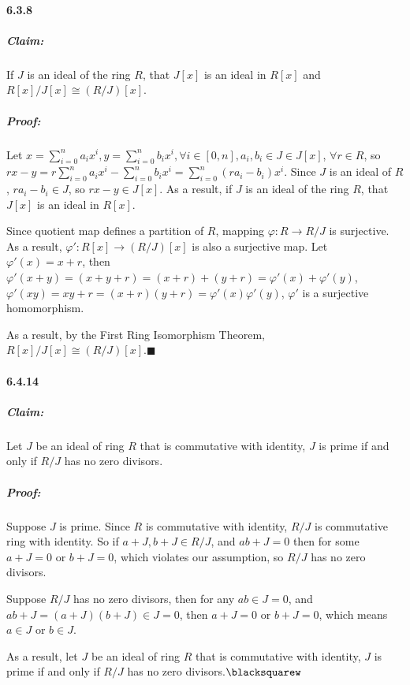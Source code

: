 \documentclass[11pt]{article}
\begin{document}
	\paragraph{6.3.8}
		\subparagraph{Claim:} If $J$ is an ideal of the ring $R$, that $J[x]$ is an ideal in $R[x]$ and $R[x]/J[x] \cong (R/J)[x]$.
		\subparagraph{Proof:} Let $x = \sum_{i = 0}^n a_ix^i , y = \sum_{i = 0}^n b_ix^i, \forall i \in [0, n], a_i, b_i\in J \in J[x]$, $\forall r \in R$, so $rx - y = r\sum_{i = 0}^n a_ix^i - \sum_{i = 0}^n b_ix^i = \sum_{i = 0}^n (ra_i - b_i)x^i$. Since $J$ is an ideal of $R$, $ra_i - b_i \in J$, so $rx - y \in J[x]$. As a result, if $J$ is an ideal of the ring $R$, that $J[x]$ is an ideal in $R[x]$.
		
		 Since quotient map defines a partition of $R$, mapping $\varphi: R \rightarrow R/J$ is surjective. As a result, $\varphi': R[x] \rightarrow (R/J)[x]$ is also a surjective map. Let $\varphi'(x) = x + r$, then $\varphi'(x + y) = (x + y + r) = (x + r) + (y + r) = \varphi'(x) + \varphi'(y)$, $\varphi'(xy) = xy + r = (x + r)(y + r) = \varphi'(x)\varphi'(y)$, $\varphi'$ is a surjective homomorphism.
		 
		 As a result, by the First Ring Isomorphism Theorem, $R[x]/J[x] \cong (R/J)[x]$.$\blacksquare$
	\paragraph{6.4.14}
		\subparagraph{Claim:} Let $J$ be an ideal of ring $R$ that is commutative with identity, $J$ is prime if and only if $R/J$ has no zero divisors.
		\subparagraph{Proof:} Suppose $J$ is prime. Since $R$ is commutative with identity, $R/J$ is commutative ring with identity. So if $a + J, b + J \in R/J$, and $ab + J = 0$ then for some $a + J = 0$ or $b + J = 0$, which violates our assumption, so  $R/J$ has no zero divisors.
		
		Suppose $R/J$ has no zero divisors, then for any $ab \in J = 0$, and $ab + J = (a + J)(b + J) \in J = 0$, then $a + J = 0$ or $b + J = 0$, which means $a \in J$ or $b \in J$.
		
		As a result, let $J$ be an ideal of ring $R$ that is commutative with identity, $J$ is prime if and only if $R/J$ has no zero divisors.$\blacksquarew$
\end{document}
